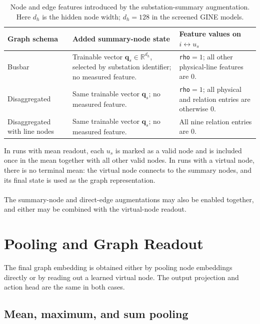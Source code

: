 \begin{table}[H]
  \centering
  \small
  \caption{Node and edge features introduced by the substation-summary
  augmentation. Here $d_h$ is the hidden node width; $d_h=128$ in the screened
  GINE models.}
  \label{tab:summary-node-augmentation-features}
  \setlength{\tabcolsep}{4pt}
  \begin{tabular}{L{0.20\textwidth}L{0.31\textwidth}L{0.39\textwidth}}
    \toprule
    Graph schema & Added summary-node state & Feature values on $i\leftrightarrow u_s$ \\
    \midrule
    Busbar & Trainable vector $\mathbf{q}_s\in\mathbb{R}^{d_h}$, selected by substation identifier; no measured feature. & \texttt{rho}$=1$; all other physical-line features are $0$. \\
    Disaggregated & Same trainable vector $\mathbf{q}_s$; no measured feature. & \texttt{rho}$=1$; all physical and relation entries are otherwise $0$. \\
    Disaggregated with line nodes & Same trainable vector $\mathbf{q}_s$; no measured feature. & All nine relation entries are $0$. \\
    \bottomrule
  \end{tabular}
\end{table}

\noindent In runs with mean readout, each $u_s$ is marked as a valid node and is
included once in the mean together with all other valid nodes. In runs with a virtual
node, there is no terminal mean: the virtual node connects to the summary nodes,
and its final state is used as the graph representation.
\\
\\
The summary-node and direct-edge augmentations may also be enabled together,
and either may be combined with the virtual-node readout.


\section{Pooling and Graph Readout}
\label{sec:graph-pooling}

The final graph embedding is obtained either by pooling node embeddings directly
or by reading out a learned virtual node. The output projection and action head
are the same in both cases.

\subsection{Mean, maximum, and sum pooling}
\label{subsec:graph-mean-pooling}

